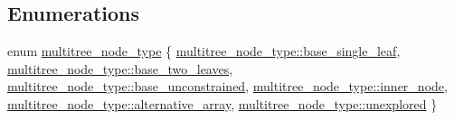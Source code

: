 \subsection*{Enumerations}
\begin{DoxyCompactItemize}
\item 
enum \hyperlink{namespaceterraces_ae1e4987c27eddd3b87041a2f0479bcc1}{multitree\+\_\+node\+\_\+type} \{ \newline
\hyperlink{namespaceterraces_ae1e4987c27eddd3b87041a2f0479bcc1a70e35885c895c187b609f94b096e29f1}{multitree\+\_\+node\+\_\+type\+::base\+\_\+single\+\_\+leaf}, 
\hyperlink{namespaceterraces_ae1e4987c27eddd3b87041a2f0479bcc1adfa457b833292690acca0e88b7b6f5c9}{multitree\+\_\+node\+\_\+type\+::base\+\_\+two\+\_\+leaves}, 
\hyperlink{namespaceterraces_ae1e4987c27eddd3b87041a2f0479bcc1a9c3d991ae32ae0f5981317c6cc6df349}{multitree\+\_\+node\+\_\+type\+::base\+\_\+unconstrained}, 
\hyperlink{namespaceterraces_ae1e4987c27eddd3b87041a2f0479bcc1adccfcf9079db20b56ceaa83c0117b85b}{multitree\+\_\+node\+\_\+type\+::inner\+\_\+node}, 
\newline
\hyperlink{namespaceterraces_ae1e4987c27eddd3b87041a2f0479bcc1a3efbbe65015e1cffe03f16adbb19f7db}{multitree\+\_\+node\+\_\+type\+::alternative\+\_\+array}, 
\hyperlink{namespaceterraces_ae1e4987c27eddd3b87041a2f0479bcc1a842481836d8f0854f1e1e50788f5b4be}{multitree\+\_\+node\+\_\+type\+::unexplored}
 \}
\end{DoxyCompactItemize}
